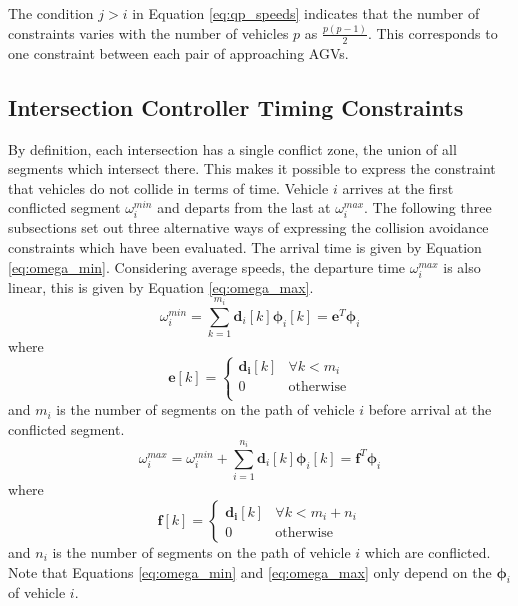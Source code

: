 The condition $j>i$ in Equation \ref{eq:qp_speeds} indicates that the number of constraints varies with the number of vehicles $p$ as $\frac{p(p-1)}{2}$. This corresponds to one constraint between each pair of approaching AGVs.

\subsection{Intersection Controller Timing Constraints}
By definition, each intersection has a single conflict zone, the union of all segments which intersect there. This makes it possible to express the constraint that vehicles do not collide in terms of time. Vehicle $i$ arrives at the first conflicted segment $\omega_i^{min}$ and departs from the last at $\omega_i^{max}$. The following three subsections set out three alternative ways of expressing the collision avoidance constraints which have been evaluated. 
The arrival time is given by Equation \ref{eq:omega_min}. Considering average speeds, the departure time $\omega_i^{max}$ is also linear, this is given by Equation \ref{eq:omega_max}. 
\begin{equation}
\omega_i^{min}  = \sum_{k=1}^{m_i} \bm{d}_i [k] \bm{\phi}_i [k] = \bm{e}^T \bm{\phi}_i
\label{eq:omega_min}
\end{equation}
where %
\begin{equation}
\bm{e}[k] = \left\{
\begin{array}{cc}
\bm{d_i}[k] & \forall k <m_i \\
0 & \textrm{otherwise} \\
\end{array}
\right.
\end{equation}  and $m_i$ is the number of segments on the path of vehicle $i$ before arrival at the conflicted segment. 
\begin{equation}
\omega_i^{max}  = \omega_i^{min} + \sum_{i=1}^{n_i} \bm{d}_i [k] \bm{\phi}_i [k] = \bm{f}^T \bm{\phi}_i
\label{eq:omega_max}
\end{equation}
where 
\begin{equation}
\bm{f}[k] = \left\{
\begin{array}{cc}
\bm{d_i}[k] & \forall k <m_i+n_i \\
0 & \textrm{otherwise} 
\end{array}
\right.
\end{equation}
 and $n_i$ is the number of segments on the path of vehicle $i$ which are conflicted. Note that Equations \ref{eq:omega_min} and \ref{eq:omega_max} only depend on the $\bm{\phi}_i$ of vehicle $i$. 



